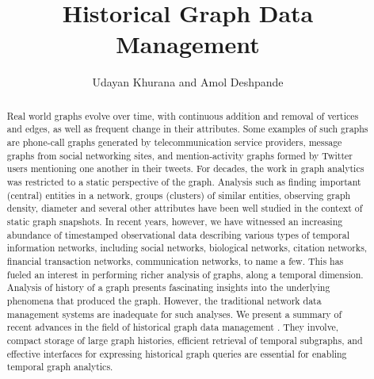 \documentclass{svjour3}
\begin{document}
\title{Historical Graph Data Management}
\author{Udayan Khurana and Amol Deshpande}
%
%
\maketitle

\begin{abstract}

Real world graphs evolve over time, with continuous addition and removal of vertices and edges, as well as frequent change in their attributes. Some examples of such graphs are phone-call graphs generated by telecommunication service providers, message graphs from social networking sites, and mention-activity graphs formed by Twitter users mentioning one another in their tweets.
For decades, the work in graph analytics was restricted to a static perspective of the graph. Analysis such as finding important (central) entities in a network, groups (clusters) of similar entities, observing graph density, diameter and several other attributes have been well studied in the context of static graph snapshots. 
In recent years, however, we have witnessed an increasing abundance of timestamped observational data describing
various types of temporal information networks, including social networks, biological networks,
citation networks, financial transaction networks, communication networks, to
name a few. This has fueled an interest in performing richer analysis of graphs, along a temporal dimension. Analysis of history of a graph presents fascinating insights into the underlying phenomena that produced the graph. 
However, the traditional network data management systems are inadequate for such analyses. We present a summary of recent advances in the field of historical graph data management . They involve, compact storage of large graph histories, efficient retrieval of temporal subgraphs, and effective interfaces for expressing historical graph queries are essential for enabling temporal graph analytics.  
\end{abstract}
\end{document}
